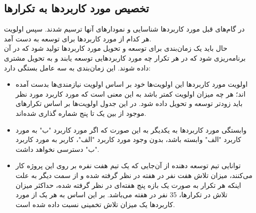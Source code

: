 \documentclass[12pt]{article}
\begin{document}
	\subsection{تخصیص مورد کاربردها به تکرارها}
	در گام‌های قبل مورد کاربردها شناسایی و نمودارهای آنها ترسیم شدند. سپس اولویت هر کدام از مورد کاربردها برای توسعه به دست آمد.\\
	حال باید یک زمان‌بندی برای توسعه و تحویل مورد کاربردها تولید شود که در آن برنامه‌ریزی شود که در هر تکرار چه مورد کاربردهایی توسعه یابند و به تحویل مشتری داده شوند.
	این زمان‌بندی به سه عامل بستگی دارد:
	\begin{itemize}
		\item اولویت مورد کاربردها
		این اولویت‌ها خود بر اساس اولویت نیازمندی‌ها بدست آمده اند؛ هر چه میزان اولویت کمتر باشد به این معنی است که مورد کاربرد مورد نظر باید زودتر توسعه و تحویل داده شود. در این جدول اولویت‌ها بر اساس تکرارهای موجود از بین یک تا پنج شماره گذاری شده‌اند.
		\item وابستگی مورد کاربردها به یکدیگر
		به این صورت که اگر مورد کاربرد "ب" به مورد کاربرد "الف" وابسته باشد، بدون وجود مورد کاربرد "الف"، کاربر به مورد کاربرد "ب" دسترسی نخواهد داشت.
		\item توانایی تیم توسعه دهنده
		از آن‌جایی که یک تیم هفت نفره بر روی این پروژه کار می‌کنند، میزان تلاش هفت نفر در هفته در نظر گرفته شده و از سمت دیگر به علت اینکه هر تکرار به صورت یک بازه‌ پنج هفته‌ای در نظر گرفته شده، حداکثر میزان تلاش در تکرارها، 35 نفر در هفته می‌باشد. بر این اساس به هر یک از مورد کاربردها یک میزان تلاش تخمینی نسبت داده شده است.
	\end{itemize}
\end{document}
